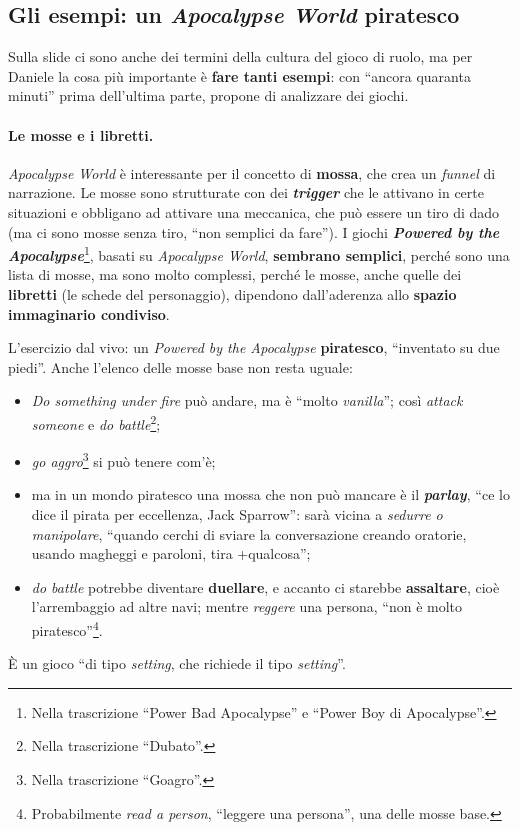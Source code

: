 \subsection{Gli esempi: un \emph{Apocalypse World} piratesco}

Sulla slide ci sono anche dei termini della cultura del gioco di ruolo, ma per Daniele la cosa più
importante è \textbf{fare tanti esempi}: con ``ancora quaranta minuti'' prima dell'ultima parte,
propone di analizzare dei giochi.

\paragraph{Le mosse e i libretti.} \emph{Apocalypse World} è interessante per il concetto di
\textbf{mossa}, che crea un \emph{funnel} di narrazione. Le mosse sono strutturate con dei
\textbf{\emph{trigger}} che le attivano in certe situazioni e obbligano ad attivare una meccanica,
che può essere un tiro di dado (ma ci sono mosse senza tiro, ``non semplici da fare''). I giochi
\textbf{\emph{Powered by the Apocalypse}}\footnote{Nella trascrizione ``Power Bad Apocalypse'' e
``Power Boy di Apocalypse''.}, basati su \emph{Apocalypse World}, \textbf{sembrano semplici},
perché sono una lista di mosse, ma sono molto complessi, perché le mosse, anche quelle dei
\textbf{libretti} (le schede del personaggio), dipendono dall'aderenza allo \textbf{spazio
immaginario condiviso}.

L'esercizio dal vivo: un \emph{Powered by the Apocalypse} \textbf{piratesco}, ``inventato su due
piedi''. Anche l'elenco delle mosse base non resta uguale:
\begin{itemize}
  \item \emph{Do something under fire} può andare, ma è ``molto \emph{vanilla}''; così \emph{attack
        someone} e \emph{do battle}\footnote{Nella trascrizione ``Dubato''.};
  \item \emph{go aggro}\footnote{Nella trascrizione ``Goagro''.} si può tenere com'è;
  \item ma in un mondo piratesco una mossa che non può mancare è il \textbf{\emph{parlay}}, ``ce lo
        dice il pirata per eccellenza, Jack Sparrow'': sarà vicina a \emph{sedurre o manipolare},
        ``quando cerchi di sviare la conversazione creando oratorie, usando magheggi e paroloni,
        tira +qualcosa'';
  \item \emph{do battle} potrebbe diventare \textbf{duellare}, e accanto ci starebbe
        \textbf{assaltare}, cioè l'arrembaggio ad altre navi; mentre \emph{reggere} una persona,
        ``non è molto piratesco''\footnote{Probabilmente \emph{read a person}, ``leggere una
        persona'', una delle mosse base.}.
\end{itemize}
È un gioco ``di tipo \emph{setting}, che richiede il tipo \emph{setting}''.

